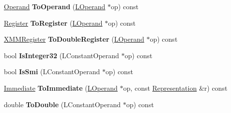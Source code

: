 \begin{DoxyCompactItemize}
\item 
\hyperlink{classv8_1_1internal_1_1_operand}{Operand} {\bfseries To\+Operand} (\hyperlink{classv8_1_1internal_1_1_l_operand}{L\+Operand} $\ast$op) const \hypertarget{classv8_1_1internal_1_1_l_code_gen_a4cf154a6406dded9b5b784b568192163}{}\label{classv8_1_1internal_1_1_l_code_gen_a4cf154a6406dded9b5b784b568192163}

\item 
\hyperlink{structv8_1_1internal_1_1_register}{Register} {\bfseries To\+Register} (\hyperlink{classv8_1_1internal_1_1_l_operand}{L\+Operand} $\ast$op) const \hypertarget{classv8_1_1internal_1_1_l_code_gen_ab3dda8b86a7b8303006365eb51069db1}{}\label{classv8_1_1internal_1_1_l_code_gen_ab3dda8b86a7b8303006365eb51069db1}

\item 
\hyperlink{structv8_1_1internal_1_1_double_register}{X\+M\+M\+Register} {\bfseries To\+Double\+Register} (\hyperlink{classv8_1_1internal_1_1_l_operand}{L\+Operand} $\ast$op) const \hypertarget{classv8_1_1internal_1_1_l_code_gen_a40807ab5428a4c2bc619be6df1f01aaa}{}\label{classv8_1_1internal_1_1_l_code_gen_a40807ab5428a4c2bc619be6df1f01aaa}

\item 
bool {\bfseries Is\+Integer32} (L\+Constant\+Operand $\ast$op) const \hypertarget{classv8_1_1internal_1_1_l_code_gen_a2d621118ecad14881a0c90e0989b31e0}{}\label{classv8_1_1internal_1_1_l_code_gen_a2d621118ecad14881a0c90e0989b31e0}

\item 
bool {\bfseries Is\+Smi} (L\+Constant\+Operand $\ast$op) const \hypertarget{classv8_1_1internal_1_1_l_code_gen_ae0339cb277e927ff5d2073eb7790018a}{}\label{classv8_1_1internal_1_1_l_code_gen_ae0339cb277e927ff5d2073eb7790018a}

\item 
\hyperlink{classv8_1_1internal_1_1_immediate}{Immediate} {\bfseries To\+Immediate} (\hyperlink{classv8_1_1internal_1_1_l_operand}{L\+Operand} $\ast$op, const \hyperlink{classv8_1_1internal_1_1_representation}{Representation} \&r) const \hypertarget{classv8_1_1internal_1_1_l_code_gen_a30d7456815ddc0dc136bd9a084aecc1b}{}\label{classv8_1_1internal_1_1_l_code_gen_a30d7456815ddc0dc136bd9a084aecc1b}

\item 
double {\bfseries To\+Double} (L\+Constant\+Operand $\ast$op) const \hypertarget{classv8_1_1internal_1_1_l_code_gen_a9859cf602181324ec10970ab93416aaa}{}\label{classv8_1_1internal_1_1_l_code_gen_a9859cf602181324ec10970ab93416aaa}


\end{DoxyCompactItemize}
